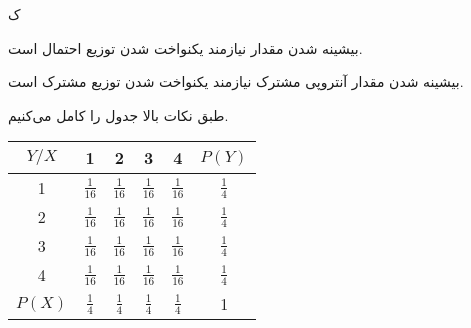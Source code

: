 \SubProblem
{ک}
{
    بیشینه شدن مقدار 
    نیازمند یکنواخت شدن توزیع احتمال 
    است. 
    
    بیشینه شدن مقدار آنتروپی مشترک 
    نیازمند یکنواخت شدن توزیع مشترک 
    است.
    
    طبق نکات بالا جدول را کامل می‌کنیم.

    \begin{latin}
    \begin{center}
      \renewcommand{\arraystretch}{1.6}
      \begin{tabular}{| c | c | c | c | c | c |}
        \hline
        $Y/X$ & 1 & 2 & 3 & 4 & $P(Y)$ \\ \hline
        1 & $\frac{1}{16}$ & $\frac{1}{16}$ & $\frac{1}{16}$ & $\frac{1}{16}$ & $\frac{1}{4}$ \\ \hline
        2 & $\frac{1}{16}$ & $\frac{1}{16}$ & $\frac{1}{16}$ & $\frac{1}{16}$ & $\frac{1}{4}$ \\ \hline
        3 & $\frac{1}{16}$ & $\frac{1}{16}$ & $\frac{1}{16}$ & $\frac{1}{16}$ & $\frac{1}{4}$ \\ \hline
        4 & $\frac{1}{16}$ & $\frac{1}{16}$ & $\frac{1}{16}$ & $\frac{1}{16}$ & $\frac{1}{4}$ \\ \hline
        $P(X)$ & $\frac{1}{4}$ & $\frac{1}{4}$ & $\frac{1}{4}$ & $\frac{1}{4}$ & 1 \\
        \hline
      \end{tabular}
    \end{center}
    \end{latin}
}